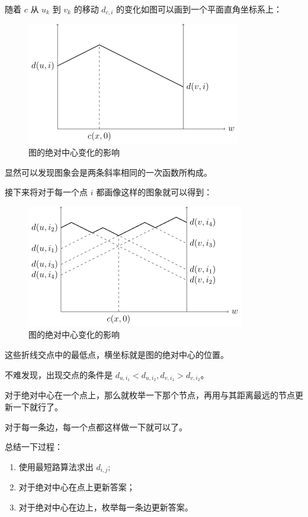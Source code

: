 \documentclass{cumcmthesis}
\begin{document}
随着 $c$ 从 $u_k$ 到 $v_k$ 的移动 $d_{c,i}$ 的变化如图可以画到一个平面直角坐标系上：

\begin{figure}[H]
	\centering
	\includegraphics{images/mdst-plot1.png}
	\caption{图的绝对中心变化的影响\cite{oiwiki-dmst}}
	\label{fig:mdst-graph}
\end{figure}

显然可以发现图象会是两条斜率相同的一次函数所构成。

接下来将对于每一个点 $i$ 都画像这样的图象就可以得到：

\begin{figure}[H]
	\centering
	\includegraphics{images/mdst-plot2.png}
	\caption{图的绝对中心变化的影响\cite{oiwiki-dmst}}
	\label{fig:mdst-graph}
\end{figure}

这些折线交点中的最低点，横坐标就是图的绝对中心的位置。

不难发现，出现交点的条件是 $d_{u,i_1} < d_{u,i_2},d_{v,i_1} > d_{v,i_2}$。

对于绝对中心在一个点上，那么就枚举一下那个节点，再用与其距离最远的节点更新一下就行了。

对于每一条边，每一个点都这样做一下就可以了。

总结一下过程：

\begin{enumerate}
    \item 使用最短路算法求出 $d_{i,j}$;
    \item 对于绝对中心在点上更新答案；
    \item 对于绝对中心在边上，枚举每一条边更新答案。
\end{enumerate}
\end{document}
